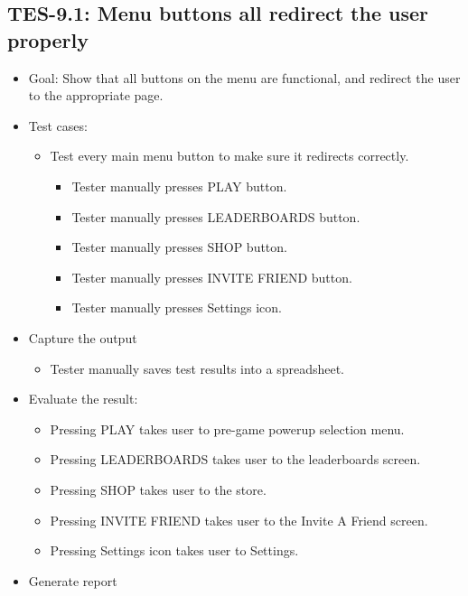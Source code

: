 \subsection{TES-9.1: Menu buttons all redirect the user properly }
\begin{itemize}
\item Goal: Show that all buttons on the menu are functional, and redirect the user to the appropriate page.
\item Test cases: 

\begin{itemize}
\item Test every main menu button to make sure it redirects correctly.

\begin{itemize}
\item Tester manually presses PLAY button.
\item Tester manually presses LEADERBOARDS button.
\item Tester manually presses SHOP button.
\item Tester manually presses INVITE FRIEND button.
\item Tester manually presses Settings icon.

\end{itemize}

\end{itemize}
\item Capture the output
\begin{itemize}
\item Tester manually saves test results into a spreadsheet.
\end{itemize}
\item Evaluate the result: 

\begin{itemize}
\item Pressing PLAY takes user to pre-game powerup selection menu.
\item Pressing LEADERBOARDS takes user to the leaderboards screen.
\item Pressing SHOP takes user to the store.
\item Pressing INVITE FRIEND takes user to the Invite A Friend screen.
\item Pressing Settings icon takes user to Settings.
\end{itemize}
\item Generate report
\end{itemize}

